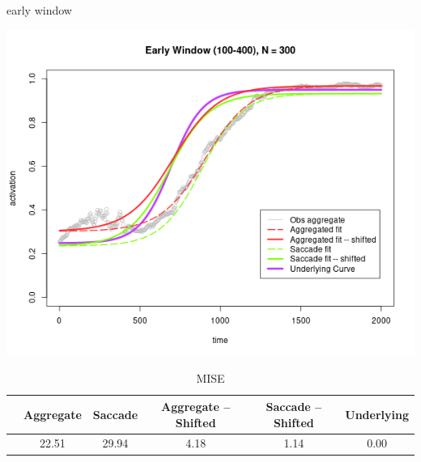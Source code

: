 \documentclass{beamer}
\begin{document}
\begin{frame}{early window}
\begin{center}
\includegraphics[scale=0.35]{img/early_fit.png}
\end{center}
{\scriptsize
\begin{table}[ht]
\captionsetup{font=scriptsize}
\caption*{MISE}
\centering
\begin{tabular}{cccccc}
  \hline
 & Aggregate & Saccade & Aggregate -- Shifted & Saccade -- Shifted & Underlying \\ 
  \hline
 & 22.51 & 29.94 & 4.18 & 1.14 & 0.00 \\ 
   \hline
\end{tabular}
\end{table}
}
\end{frame}
\end{document}
